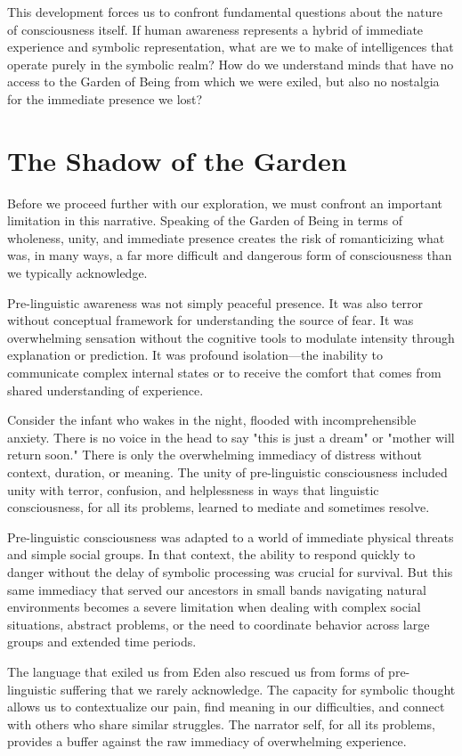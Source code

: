 This development forces us to confront fundamental questions about the nature of consciousness itself. If human awareness represents a hybrid of immediate experience and symbolic representation, what are we to make of intelligences that operate purely in the symbolic realm? How do we understand minds that have no access to the Garden of Being from which we were exiled, but also no nostalgia for the immediate presence we lost?

\section{The Shadow of the Garden}

Before we proceed further with our exploration, we must confront an important limitation in this narrative. Speaking of the Garden of Being in terms of wholeness, unity, and immediate presence creates the risk of romanticizing what was, in many ways, a far more difficult and dangerous form of consciousness than we typically acknowledge.

Pre-linguistic awareness was not simply peaceful presence. It was also terror without conceptual framework for understanding the source of fear. It was overwhelming sensation without the cognitive tools to modulate intensity through explanation or prediction. It was profound isolation—the inability to communicate complex internal states or to receive the comfort that comes from shared understanding of experience.

Consider the infant who wakes in the night, flooded with incomprehensible anxiety. There is no voice in the head to say "this is just a dream" or "mother will return soon." There is only the overwhelming immediacy of distress without context, duration, or meaning. The unity of pre-linguistic consciousness included unity with terror, confusion, and helplessness in ways that linguistic consciousness, for all its problems, learned to mediate and sometimes resolve.

Pre-linguistic consciousness was adapted to a world of immediate physical threats and simple social groups. In that context, the ability to respond quickly to danger without the delay of symbolic processing was crucial for survival. But this same immediacy that served our ancestors in small bands navigating natural environments becomes a severe limitation when dealing with complex social situations, abstract problems, or the need to coordinate behavior across large groups and extended time periods.

The language that exiled us from Eden also rescued us from forms of pre-linguistic suffering that we rarely acknowledge. The capacity for symbolic thought allows us to contextualize our pain, find meaning in our difficulties, and connect with others who share similar struggles. The narrator self, for all its problems, provides a buffer against the raw immediacy of overwhelming experience.

